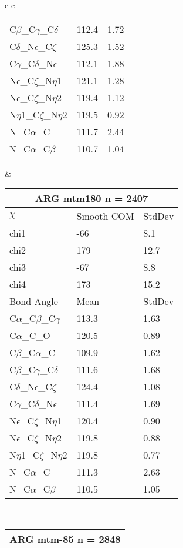 \begin{longtable}{ c c }
\begin{tabular}{ l l l }
  C$\beta$\_C$\gamma$\_C$\delta$ & 112.4 & 1.72\\
  C$\delta$\_N$\epsilon$\_C$\zeta$ & 125.3 & 1.52\\
  C$\gamma$\_C$\delta$\_N$\epsilon$ & 112.1 & 1.88\\
  N$\epsilon$\_C$\zeta$\_N$\eta$1 & 121.1 & 1.28\\
  N$\epsilon$\_C$\zeta$\_N$\eta$2 & 119.4 & 1.12\\
  N$\eta$1\_C$\zeta$\_N$\eta$2 & 119.5 & 0.92\\
  N\_C$\alpha$\_C & 111.7 & 2.44\\
  N\_C$\alpha$\_C$\beta$ & 110.7 & 1.04\\
  \bottomrule
  \end{tabular}
  &
  \begin{tabular}{ l l l }
  \toprule
  \multicolumn{3}{c}{ARG \textbf{mtm180} n = 2407} \\ \toprule
  $\chi$       & Smooth COM & StdDev \\ \midrule
  chi1 & -66 & 8.1 \\ 
  chi2 & 179 & 12.7 \\ 
  chi3 & -67 & 8.8 \\ 
  chi4 & 173 & 15.2 \\ \midrule
  Bond Angle   & Mean     & StdDev \\ \midrule
  C$\alpha$\_C$\beta$\_C$\gamma$ & 113.3 & 1.63\\
  C$\alpha$\_C\_O & 120.5 & 0.89\\
  C$\beta$\_C$\alpha$\_C & 109.9 & 1.62\\
  C$\beta$\_C$\gamma$\_C$\delta$ & 111.6 & 1.68\\
  C$\delta$\_N$\epsilon$\_C$\zeta$ & 124.4 & 1.08\\
  C$\gamma$\_C$\delta$\_N$\epsilon$ & 111.4 & 1.69\\
  N$\epsilon$\_C$\zeta$\_N$\eta$1 & 120.4 & 0.90\\
  N$\epsilon$\_C$\zeta$\_N$\eta$2 & 119.8 & 0.88\\
  N$\eta$1\_C$\zeta$\_N$\eta$2 & 119.8 & 0.77\\
  N\_C$\alpha$\_C & 111.3 & 2.63\\
  N\_C$\alpha$\_C$\beta$ & 110.5 & 1.05\\
  \bottomrule
  \end{tabular}
  \\
  \begin{tabular}{ l l l }
  \toprule
  \multicolumn{3}{c}{ARG \textbf{mtm-85} n = 2848} \\ \toprule

\end{tabular}
\end{longtable}

